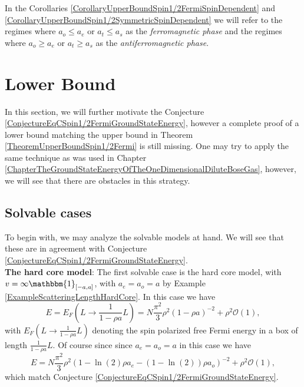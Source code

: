 \begin{remark}
	In the Corollaries \ref{CorollaryUpperBoundSpin1/2FermiSpinDependent} and \ref{CorollaryUpperBoundSpin1/2SymmetricSpinDependent} we will refer to the regimes where $ a_o\leq a_e $ or $ a_t\leq a_s $ as the \emph{ferromagnetic phase} and the regimes where $ a_o\geq a_e $ or $ a_t\geq a_s $ as the \emph{antiferromagnetic phase}. 
\end{remark}

\section{Lower Bound}
In this section, we will further motivate the Conjecture \ref{ConjectureEqCSpin1/2FermiGroundStateEnergy}, however a complete proof of a lower bound matching the upper bound in Theorem \ref{TheoremUpperBoundSpin1/2Fermi} is still missing. One may try to apply the same technique as was used in Chapter \ref{ChapterTheGroundStateEnergyOfTheOneDimensionalDiluteBoseGas}, however, we will see that there are obstacles in this strategy.\\
\subsection{Solvable cases}
To begin with, we may analyze the solvable models at hand. We will see that these are in agreement with Conjecture \ref{ConjectureEqCSpin1/2FermiGroundStateEnergy}.\\

\textbf{The hard core model}: The first solvable case is the hard core model, with $ v=\infty \mathbbm{1}_{[-a,a]} $, with $ a_e=a_o=a $ by Example \ref{ExampleScatteringLengthHardCore}. In this case we have \begin{equation}
E=E_F\left(L\to \frac{1}{1-\rho a}L\right)=N\frac{\pi^2}{3}\rho^2\left(1-\rho a\right)^{-2}+\rho^2\mathcal{O}(1),
\end{equation} 
with $ E_F\left(L\to \frac{1}{1-\rho a}L\right) $ denoting the spin polarized free Fermi energy in a box of length $ \frac{1}{1-\rho a}L $. Of course since since $ a_e=a_o=a $ in this case we have \begin{equation}
E=N\frac{\pi^2}{3}\rho^2\left(1-\ln(2)\rho a_e-(1-\ln(2))\rho a_o\right)^{-2}+\rho^2\mathcal{O}(1),
\end{equation}
which match Conjecture \ref{ConjectureEqCSpin1/2FermiGroundStateEnergy}.\\

